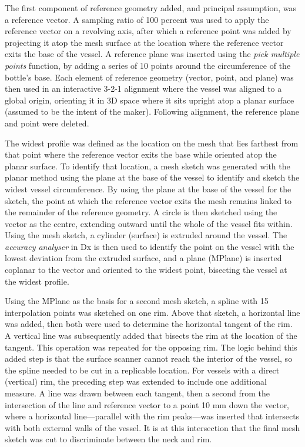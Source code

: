 \documentclass[review]{elsarticle}
\begin{document}
The first component of reference geometry added, and principal assumption, was a reference vector. A sampling ratio of 100 percent was used to apply the reference vector on a revolving axis, after which a reference point was added by projecting it atop the mesh surface at the location where the reference vector exits the base of the vessel. A reference plane was inserted using the \textit{pick multiple points} function, by adding a series of 10 points around the circumference of the bottle's base. Each element of reference geometry (vector, point, and plane) was then used in an interactive 3-2-1 alignment where the vessel was aligned to a global origin, orienting it in 3D space where it sits upright atop a planar surface (assumed to be the intent of the maker). Following alignment, the reference plane and point were deleted.

The widest profile was defined as the location on the mesh that lies farthest from that point where the reference vector exits the base while oriented atop the planar surface. To identify that location, a mesh sketch was generated with the planar method using the plane at the base of the vessel to identify and sketch the widest vessel circumference. By using the plane at the base of the vessel for the sketch, the point at which the reference vector exits the mesh remains linked to the remainder of the reference geometry. A circle is then sketched using the vector as the centre, extending outward until the whole of the vessel fits within. Using the mesh sketch, a cylinder (surface) is extruded around the vessel. The \textit{accuracy analyser} in Dx is then used to identify the point on the vessel with the lowest deviation from the extruded surface, and a plane (MPlane) is inserted coplanar to the vector and oriented to the widest point, bisecting the vessel at the widest profile.

Using the MPlane as the basis for a second mesh sketch, a spline with 15 interpolation points was sketched on one rim. Above that sketch, a horizontal line was added, then both were used to determine the horizontal tangent of the rim. A vertical line was subsequently added that bisects the rim at the location of the tangent. This operation was repeated for the opposing rim. The logic behind this added step is that the surface scanner cannot reach the interior of the vessel, so the spline needed to be cut in a replicable location. For vessels with a direct (vertical) rim, the preceding step was extended to include one additional measure. A line was drawn between each tangent, then a second from the intersection of the line and reference vector to a point 10 mm down the vector, where a horizontal line---parallel with the rim peaks---was inserted that intersects with both external walls of the vessel. It is at this intersection that the final mesh sketch was cut to discriminate between the neck and rim.
\end{document}
